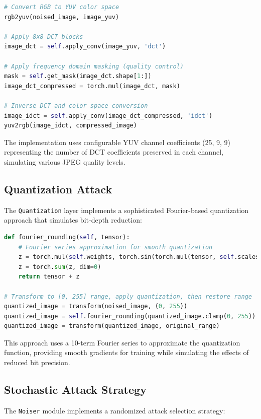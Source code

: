 \documentclass[12pt,a4paper]{report}
\begin{document}
\begin{lstlisting}[language=Python, caption=JPEG Compression Attack Implementation]
# Convert RGB to YUV color space
rgb2yuv(noised_image, image_yuv)

# Apply 8x8 DCT blocks
image_dct = self.apply_conv(image_yuv, 'dct')

# Apply frequency domain masking (quality control)
mask = self.get_mask(image_dct.shape[1:])
image_dct_compressed = torch.mul(image_dct, mask)

# Inverse DCT and color space conversion
image_idct = self.apply_conv(image_dct_compressed, 'idct')
yuv2rgb(image_idct, compressed_image)
\end{lstlisting}

The implementation uses configurable YUV channel coefficients (25, 9, 9) representing the number of DCT coefficients preserved in each channel, simulating various JPEG quality levels.

\subsection{Quantization Attack}

The \texttt{Quantization} layer implements a sophisticated Fourier-based quantization approach that simulates bit-depth reduction:

\begin{lstlisting}[language=Python, caption=Quantization Attack Implementation]
def fourier_rounding(self, tensor):
    # Fourier series approximation for smooth quantization
    z = torch.mul(self.weights, torch.sin(torch.mul(tensor, self.scales)))
    z = torch.sum(z, dim=0)
    return tensor + z

# Transform to [0, 255] range, apply quantization, then restore range
quantized_image = transform(noised_image, (0, 255))
quantized_image = self.fourier_rounding(quantized_image.clamp(0, 255))
quantized_image = transform(quantized_image, original_range)
\end{lstlisting}

This approach uses a 10-term Fourier series to approximate the quantization function, providing smooth gradients for training while simulating the effects of reduced bit precision.

\subsection{Stochastic Attack Strategy}

The \texttt{Noiser} module implements a randomized attack selection strategy:
\end{document}
